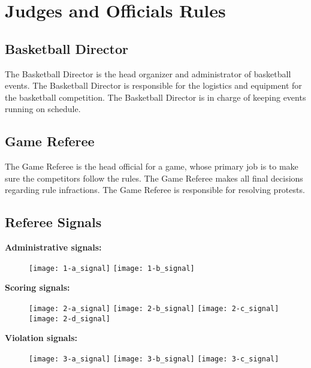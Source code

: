 
\chapter{Judges and Officials Rules}

\section{Basketball Director}

The Basketball Director is the head organizer and administrator of basketball events.
The Basketball Director is responsible for the logistics and equipment for the basketball competition.
The Basketball Director is in charge of keeping events running on schedule.

\section{Game Referee}

The Game Referee is the head official for a game, whose primary job is to make sure the competitors follow the rules.
The Game Referee makes all final decisions regarding rule infractions.
The Game Referee is responsible for resolving protests.

\newpage
\section{Referee Signals}

\textbf{Administrative signals:}

\begin{figure}[h]
\texttt{[image: 1-a\_signal]}
\texttt{[image: 1-b\_signal]}
\end{figure}

\textbf{Scoring signals:}
\begin{figure}[h]
\texttt{[image: 2-a\_signal]}
\texttt{[image: 2-b\_signal]}
\texttt{[image: 2-c\_signal]}
\texttt{[image: 2-d\_signal]}
\end{figure}

\textbf{Violation signals:}

\begin{figure}[h]
\texttt{[image: 3-a\_signal]}
\texttt{[image: 3-b\_signal]}
\texttt{[image: 3-c\_signal]}
\end{figure}
